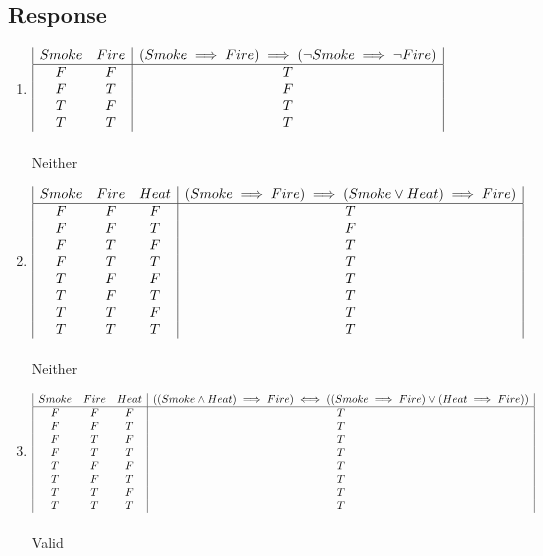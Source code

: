 \documentclass[13pt]{article}
\begin{document}
\subsection*{Response}
\begin{enumerate}[label=(\alph*)]
\item$
  \begin{array}{| c c | c |}
    Smoke & Fire & (Smoke \implies Fire) \implies (\neg Smoke \implies \neg Fire) \\
    \hline
    F & F & T \\
    F & T & F \\
    T & F & T \\
    T & T & T
  \end{array}$ \\ \\ Neither

\item$
  \begin{array}{| c c c | c |}
    Smoke & Fire & Heat & (Smoke \implies Fire) \implies (Smoke \lor Heat) \implies
                          Fire) \\
    \hline
    F & F & F & T \\
    F & F & T & F \\
    F & T & F & T \\
    F & T & T & T \\
    T & F & F & T \\
    T & F & T & T \\
    T & T & F & T \\
    T & T & T & T 
  \end{array}$ \\ \\ Neither
\item$
  \begin{array}{| c c c | c |}
    Smoke & Fire & Heat & ((Smoke \land Heat) \implies Fire) \iff ((Smoke \implies Fire)
                          \lor (Heat \implies Fire)) \\
    \hline
    F & F & F & T \\
    F & F & T & T \\
    F & T & F & T \\
    F & T & T & T \\
    T & F & F & T \\
    T & F & T & T \\
    T & T & F & T \\
    T & T & T & T 
  \end{array}$ \\ \\ Valid
  
\end{enumerate}
\end{document}

